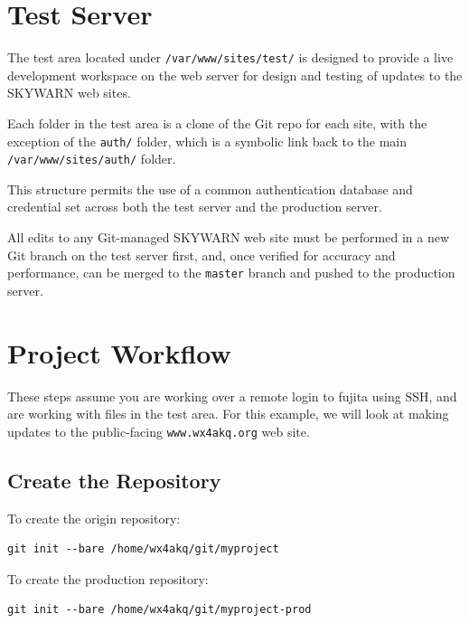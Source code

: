 \documentclass[pdflatex,letterpaper,twoside,12pt]{book}
\begin{document}

\section{Test Server}

The test area located under \texttt{/var/www/sites/test/} is designed to provide a live development workspace on the web server for design and testing of updates to the SKYWARN web sites.

Each folder in the test area is a clone of the Git repo for each site, with the exception of the \texttt{auth/} folder, which is a symbolic link back to the main\\\texttt{/var/www/sites/auth/} folder.

This structure permits the use of a common authentication database and credential set across both the test server and the production server.

All edits to any Git-managed SKYWARN web site must be performed in a new Git branch on the test server first, and, once verified for accuracy and performance, can be merged to the \texttt{master} branch and pushed to the production server.


\section{Project Workflow}

These steps assume you are working over a remote login to fujita using SSH, and are working with files in the test area.  For this example, we will look at making updates to the public-facing \texttt{www.wx4akq.org} web site.

\subsection{Create the Repository}

To create the origin repository:

\begin{lstlisting}
git init --bare /home/wx4akq/git/myproject
\end{lstlisting}

To create the production repository:

\begin{lstlisting}
git init --bare /home/wx4akq/git/myproject-prod
\end{lstlisting}
\end{document}
